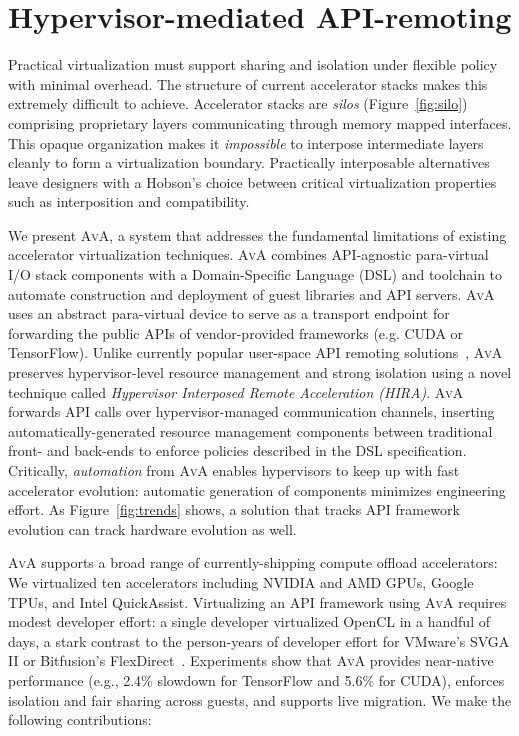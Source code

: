 \section{Hypervisor-mediated API-remoting}
\label{sec:ava}

Practical virtualization must support sharing and isolation under flexible
policy with minimal overhead. The structure of current accelerator stacks
makes this extremely difficult to achieve.
Accelerator stacks are \emph{silos} (Figure~\ref{fig:silo})
comprising proprietary layers communicating through memory mapped interfaces.
This opaque organization makes it \emph{impossible} to interpose intermediate
layers cleanly to form a virtualization boundary. Practically interposable
alternatives leave designers with a Hobson's choice between critical
virtualization properties such as interposition and compatibility.

We present \textsc{AvA}, a system that addresses the fundamental limitations
of existing accelerator virtualization techniques.
\textsc{AvA} combines API-agnostic para-virtual I/O stack components with a
Domain-Specific Language (DSL) and toolchain to automate construction
and deployment of guest libraries and API servers.
\textsc{AvA} uses an abstract para-virtual device
to serve as a transport endpoint for forwarding the public APIs of vendor-provided frameworks
(e.g. CUDA or TensorFlow).
Unlike currently popular user-space API remoting solutions~\cite{bitfusion,xaas,vmCUDA,rCUDA,cu2rcu},
\textsc{AvA} preserves hypervisor-level resource management and strong
isolation using a novel technique called \emph{{{H}ypervisor {I}nterposed {R}emote {A}cceleration} (HIRA)}.
\textsc{AvA} forwards API calls over hypervisor-managed communication channels,
inserting automatically-generated resource management components between
traditional front- and back-ends
to enforce policies described in the DSL specification.
Critically, \emph{automation} from \textsc{AvA} enables hypervisors to keep up with fast accelerator evolution: automatic generation of components minimizes engineering effort.
As Figure~\ref{fig:trends} shows, a solution that tracks API framework evolution can track hardware evolution as well.

\textsc{AvA} supports a broad range of currently-shipping
compute offload accelerators:
We virtualized ten accelerators including NVIDIA and AMD GPUs,
Google TPUs, and Intel QuickAssist.
Virtualizing an API framework using \textsc{AvA} requires modest developer effort:
a single developer virtualized OpenCL in a handful of days,
a stark contrast to the person-years of developer effort for
VMware's SVGA II or Bitfusion's FlexDirect~\cite{bitfusion}.
Experiments show that \textsc{AvA} provides
near-native performance (e.g., 2.4\% slowdown for TensorFlow and 5.6\% for CUDA),
enforces isolation and fair sharing across guests,
and supports live migration.
We make the following contributions:

